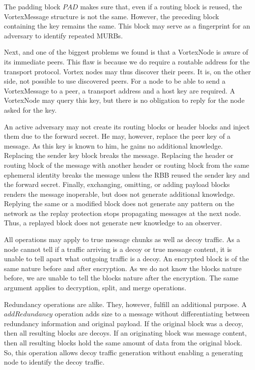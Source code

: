 \documentclass[10pt,journal,compsoc]{IEEEtran}
\begin{document}
The padding block $PAD$ makes sure that, even if a routing block is reused, the VortexMessage structure is not the same. However, the preceding block containing the key remains the same. This block may serve as a fingerprint for an adversary to identify repeated MURBs.

Next, and one of the biggest problems we found is that a VortexNode is aware of its immediate peers. This flaw is because we do require a routable address for the transport protocol. Vortex nodes may thus discover their peers. It is, on the other side, not possible to use discovered peers. For a node to be able to send a VortexMessage to a peer, a transport address and a host key are required. A VortexNode may query this key, but there is no obligation to reply for the node asked for the key.

An active adversary may not create its routing blocks or header blocks and inject them due to the forward secret. He may, however, replace the peer key of a message. As this key is known to him, he gains no additional knowledge. Replacing the sender key block breaks the message. Replacing the header or routing block of the message with another header or routing block from the same ephemeral identity breaks the message unless the RBB reused the sender key and the forward secret. Finally, exchanging, omitting, or adding payload blocks renders the message inoperable, but does not generate additional knowledge. Replying the same or a modified block does not generate any pattern on the network as the replay protection stops propagating messages at the next node. Thus, a replayed block does not generate new knowledge to an observer.

All operations may apply to true message chunks as well as decoy traffic. As a node cannot tell if a traffic arriving is a decoy or true message content, it is unable to tell apart what outgoing traffic is a decoy. An encrypted block is of the same nature before and after encryption. As we do not know the blocks nature before, we are unable to tell the blocks nature after the encryption. The same argument applies to decryption, split, and merge operations. 

Redundancy operations are alike. They, however, fulfill an additional purpose. A $addRedundancy$ operation adds size to a message without differentiating between redundancy information and original payload. If the original block was a decoy, then all resulting blocks are decoys. If an originating block was message content, then all resulting blocks hold the same amount of data from the original block. So, this operation allows decoy traffic generation without enabling a generating node to identify the decoy traffic.
\end{document}
